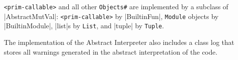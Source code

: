 \verb+<prim-callable>+ and all other
\texttt{Objects\#} are implemented by a subclass of
\pycode|AbstractMutVal|: \verb+<prim-callable>+
by \pycode|BuiltinFun|, \texttt{Module} objects by
\pycode|BuiltinModule|, \pycode|list|s by \texttt{List}, and
\pycode|tuple| by \texttt{Tuple}.

The implementation of the Abstract Interpreter also includes a class log that stores all
warnings generated in the abstract interpretation of the code.

{} {}
